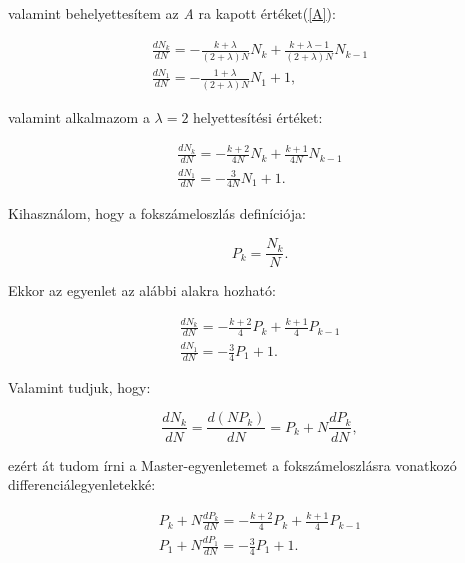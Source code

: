 \documentclass[a4paper, 12pt]{article}
\numberwithin{equation}{section}          %
\numberwithin{figure}{subsection}
\begin{document}
valamint behelyettesítem az \textit{A} ra kapott értéket(\ref{A}):

\begin{center}
	\begin{gather*}
	\frac{dN_k}{dN} =  - \frac{k + \lambda}{(2 + \lambda)N}N_k + \frac{k+\lambda-1}{(2 + \lambda)N}N_{k-1}\\
	\frac{dN_1}{dN} = - \frac{1 + \lambda}{(2 + \lambda)N}N_1 +1,
	\end{gather*}
\end{center}

valamint alkalmazom a $\lambda = 2$ helyettesítési értéket:

\begin{center}
	\begin{gather*}
	\frac{dN_k}{dN} =  - \frac{k + 2}{4N}N_k + \frac{k+1}{4N}N_{k-1}\\
	\frac{dN_1}{dN} = - \frac{3}{4N}N_1 +1.
	\end{gather*}
\end{center}

Kihasználom, hogy a fokszámeloszlás definíciója:


\begin{center}
	\begin{equation}
P_k = \frac{N_k}{N}.
	\end{equation}
\end{center}


Ekkor az egyenlet az alábbi alakra hozható:
\begin{center}
	\begin{gather*}
	\frac{dN_k}{dN} =  - \frac{k + 2}{4}P_k + \frac{k+1}{4}P_{k-1}\\
	\frac{dN_1}{dN} = - \frac{3}{4}P_1 +1.
	\end{gather*}
\end{center}

Valamint tudjuk, hogy:

\begin{center}
	\begin{equation}
	\frac{dN_k}{dN} = \frac{d(NP_k)}{dN} = P_k + N\frac{dP_k}{dN},
	\end{equation}
\end{center}

ezért át tudom írni a Master-egyenletemet a fokszámeloszlásra vonatkozó differenciálegyenletekké:

\begin{center}
	\begin{gather*}
	P_k+N\frac{dP_k}{dN} =  - \frac{k + 2}{4}P_k + \frac{k+1}{4}P_{k-1}\\
	P_1 +N\frac{dP_1}{dN} = - \frac{3}{4}P_1 +1.
	\end{gather*}
\end{center}
\end{document}

